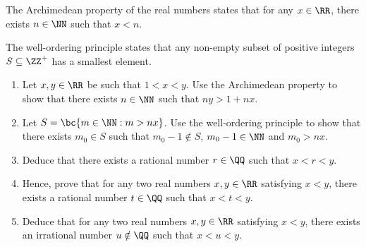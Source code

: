 \begin{problem}[\chili]
    The Archimedean property of the real numbers states that for any $x \in \RR$, there exists $n \in \NN$ such that $x < n$.

    The well-ordering principle states that any non-empty subset of positive integers $S \subseteq \ZZ^+$ has a smallest element.

    \begin{enumerate}
        \item Let $x, y \in \RR$ be such that $1 < x < y$. Use the Archimedean property to show that there exists $n \in \NN$ such that $ny >  1 + nx$.
        \item Let $S = \bc{m \in \NN : m > nx}$. Use the well-ordering principle to show that there exists $m_0 \in S$ such that $m_0 - 1 \notin S$, $m_0 -1 \in \NN$ and $m_0 > nx$.
        \item Deduce that there exists a rational number $r \in \QQ$ such that $x < r < y$.
        \item Hence, prove that for any two real numbers $x, y \in \RR$ satisfying $x < y$, there exists a rational number $t \in \QQ$ such that $x < t < y$.
        \item Deduce that for any two real numbers $x, y \in \RR$ satisfying $x < y$, there exists an irrational number $u \notin \QQ$ such that $x < u < y$.
    \end{enumerate}
\end{problem}
